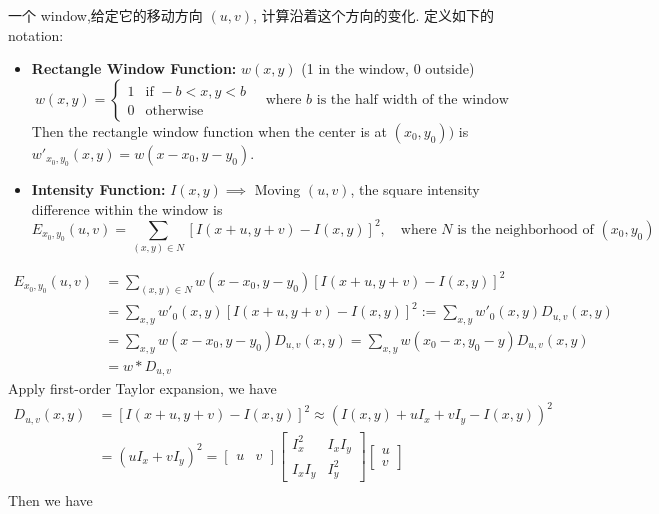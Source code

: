 一个 window,给定它的移动方向 $(u,v)$, 计算沿着这个方向的变化. 定义如下的 notation:
\begin{itemize}
    \item \textbf{Rectangle Window Function:} $w(x,y)$ (1 in the window, 0 outside)
    \[
        w(x,y)=\begin{cases}
            1 & \text{if } -b < x,y < b\\
            0 & \text{otherwise}
        \end{cases} \quad \text{where } b \text{ is the half width of the window}
    \]
    Then the rectangle window function when the center is at $(x_0,y_0))$ is $w'_{x_0,y_0}(x,y) = w(x-x_0,y-y_0)$.
    \item \textbf{Intensity Function:} $I(x,y) \implies$ Moving $(u,v)$, the square intensity difference within the window is 
    \[
        E_{x_0,y_0}(u,v)=\sum_{(x,y) \in N}[I(x+u,y+v)-I(x,y)]^2, \quad \text{where } N \text{ is the neighborhood of } (x_0,y_0)
    \] 
\end{itemize}
\begin{align*}
    E_{x_0,y_0}(u,v) &= \sum_{(x,y) \in N}w(x-x_0,y-y_0)[I(x+u,y+v)-I(x,y)]^2\\
    &= \sum_{x,y}w'_0(x,y)[I(x+u,y+v)-I(x,y)]^2 := \sum_{x,y}w'_0(x,y)D_{u,v}(x,y) \\
    &= \sum_{x,y} w(x-x_0,y-y_0) D_{u,v}(x,y) = \sum_{x,y} w(x_0-x,y_0-y) D_{u,v}(x,y) \\
    &= w \ast D_{u,v}
\end{align*}
Apply first-order Taylor expansion, we have 
\begin{equation}
    \renewcommand{\arraystretch}{0.85}
    \begin{aligned}
    D_{u,v}(x,y) &= [I(x+u,y+v)-I(x,y)]^2 \approx (I(x,y)+uI_x+vI_y-I(x,y))^2\\
    &= (uI_x+vI_y)^2 = \begin{bmatrix} u & v \end{bmatrix} \begin{bmatrix} I_x^2 & I_xI_y \\ I_xI_y & I_y^2 \end{bmatrix} \begin{bmatrix} u \\ v \end{bmatrix} \\
    \end{aligned}
\end{equation}
Then we have
